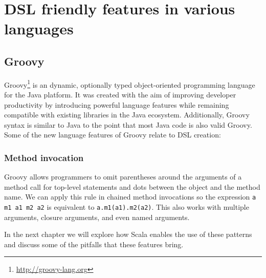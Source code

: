 \section{DSL friendly features in various languages}

\subsection{Groovy}

Groovy\footnote{\url{http://groovy-lang.org}} is an dynamic, optionally typed object-oriented programming language for the Java platform.
It was created with the aim of improving developer productivity by introducing powerful language features while remaining compatible with existing libraries in the Java ecosystem.
Additionally, Groovy syntax is similar to Java to the point that most Java code is also valid Groovy.
Some of the new language features of Groovy relate to DSL creation:

\subsubsection{Method invocation}

Groovy allows programmers to omit parentheses around the arguments of a method call for top-level statements and dots between the object and the method name.
We can apply this rule in chained method invocations so the expression \texttt{a m1 a1 m2 a2} is equivalent to \texttt{a.m1(a1).m2(a2)}.
This also works with multiple arguments, closure arguments, and even named arguments.

In the next chapter we will explore how Scala enables the use of these patterns and discuss some of the pitfalls that these features bring.
